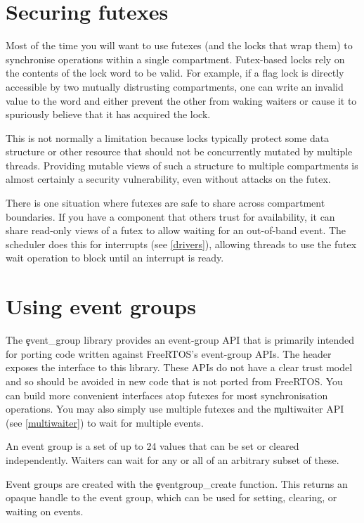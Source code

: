 \section{Securing futexes}

Most of the time you will want to use futexes (and the locks that wrap them) to synchronise operations within a single compartment.
Futex-based locks rely on the contents of the lock word to be valid.
For example, if a flag lock is directly accessible by two mutually distrusting compartments, one can write an invalid value to the word and either prevent the other from waking waiters or cause it to spuriously believe that it has acquired the lock.

This is not normally a limitation because locks typically protect some data structure or other resource that should not be concurrently mutated by multiple threads.
Providing mutable views of such a structure to multiple compartments is almost certainly a security vulnerability, even without attacks on the futex.

There is one situation where futexes are safe to share across compartment boundaries.
If you have a component that others trust for availability, it can share read-only views of a futex to allow waiting for an out-of-band event.
The scheduler does this for interrupts (see \ref{drivers}), allowing threads to use the futex wait operation to block until an interrupt is ready.

\section{Using event groups}

The \c{event_group} library provides an event-group API that is primarily intended for porting code written against FreeRTOS's event-group APIs.
The  header exposes the interface to this library.
These APIs do not have a clear trust model and so should be avoided in new code that is not ported from FreeRTOS.
You can build more convenient interfaces atop futexes for most synchronisation operations.
You may also simply use multiple futexes and the \c{multiwaiter} API (see \ref{multiwaiter}) to wait for multiple events.

An event group is a set of up to 24 values that can be set or cleared independently.
Waiters can wait for any or all of an arbitrary subset of these.

Event groups are created with the \c{eventgroup_create} function.
This returns an opaque handle to the event group, which can be used for setting, clearing, or waiting on events.

